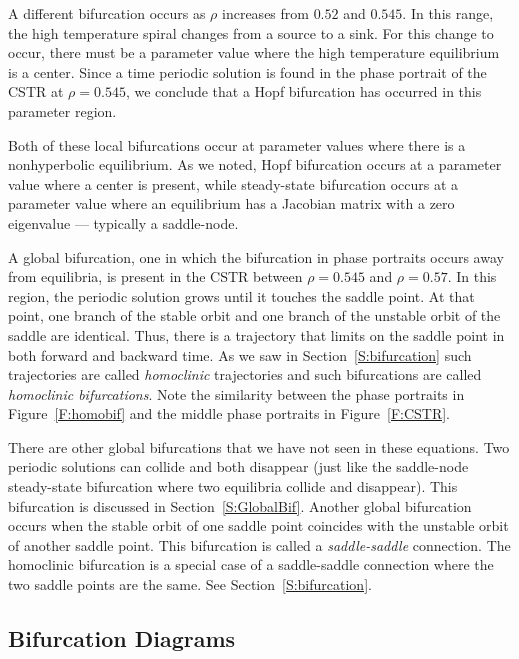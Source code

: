 \documentclass{ximera}
\begin{document}
A different bifurcation occurs as $\rho$ increases from
$0.52$ and $0.545$.  In this range, the high temperature spiral
changes from a source to a sink.  For this change to occur,
there must be a parameter value where the high temperature
equilibrium is a center.  Since a time periodic solution
is found in the phase portrait of the CSTR at $\rho=0.545$, we 
conclude that a Hopf bifurcation has occurred in this parameter region.

Both of these local bifurcations occur at parameter values where
there is a nonhyperbolic equilibrium. As we noted, Hopf
bifurcation occurs at a parameter value where a center is
present, while steady-state bifurcation occurs at a parameter value where 
an equilibrium has a Jacobian matrix with a zero eigenvalue --- typically 
a saddle-node.  

A global bifurcation, one in which the bifurcation
in phase portraits occurs away from equilibria, is present in the CSTR 
between $\rho=0.545$ and $\rho=0.57$.  In this region, the periodic solution 
grows until it touches the saddle point.  At that point, one branch of 
the stable orbit and one branch of the unstable orbit of the 
saddle are identical.  Thus, there is a trajectory that limits
on the saddle point in both forward and backward time.  As we 
saw in Section~\ref{S:bifurcation} such trajectories are called 
{\em homoclinic\/} trajectories and such bifurcations are called 
{\em homoclinic bifurcations\/}.   
  Note the similarity between the phase 
portraits in Figure~\ref{F:homobif} and the middle phase portraits in 
Figure~\ref{F:CSTR}.

There are other global bifurcations that we have not seen in 
these equations.  Two periodic solutions can collide and both 
disappear (just like the saddle-node steady-state bifurcation 
where two equilibria collide and disappear).  This bifurcation is
discussed in Section~\ref{S:GlobalBif}.  Another global 
bifurcation occurs when the stable orbit of one saddle point 
coincides with the unstable orbit of another saddle point.  
This bifurcation is called a {\em saddle-saddle\/} connection.  
The homoclinic bifurcation is a special case of a saddle-saddle 
connection where the two saddle points are the same.
  See Section~\ref{S:bifurcation}.

\subsection*{Bifurcation Diagrams}
\end{document}
